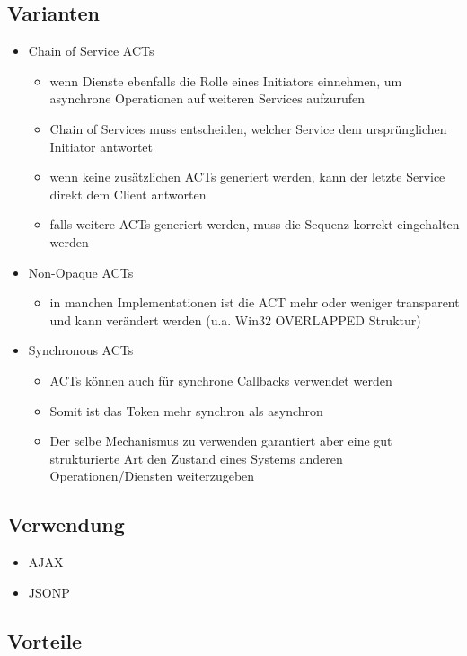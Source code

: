 \subsection{Varianten}

\begin{itemize}
	\item Chain of Service ACTs
	\begin{itemize}
		\item wenn Dienste ebenfalls die Rolle eines Initiators einnehmen, um asynchrone Operationen auf weiteren Services aufzurufen
		\item Chain of Services muss entscheiden, welcher Service dem ursprünglichen Initiator antwortet
		\item wenn keine zusätzlichen ACTs generiert werden, kann der letzte Service direkt dem Client antworten
		\item falls weitere ACTs generiert werden, muss die Sequenz korrekt eingehalten werden
	\end{itemize}
	\item Non-Opaque ACTs
	\begin{itemize}
		\item in manchen Implementationen ist die ACT mehr oder weniger transparent und kann verändert werden (u.a. Win32 OVERLAPPED Struktur)
	\end{itemize}
	\item Synchronous ACTs
	\begin{itemize}
		\item ACTs können auch für synchrone Callbacks verwendet werden
		\item Somit ist das Token mehr synchron als asynchron
		\item Der selbe Mechanismus zu verwenden garantiert aber eine gut strukturierte Art den Zustand eines Systems anderen Operationen/Diensten weiterzugeben
	\end{itemize}
\end{itemize}


\subsection{Verwendung}
\begin{itemize}
	\item AJAX
	\item JSONP
\end{itemize}


\subsection{Vorteile}

